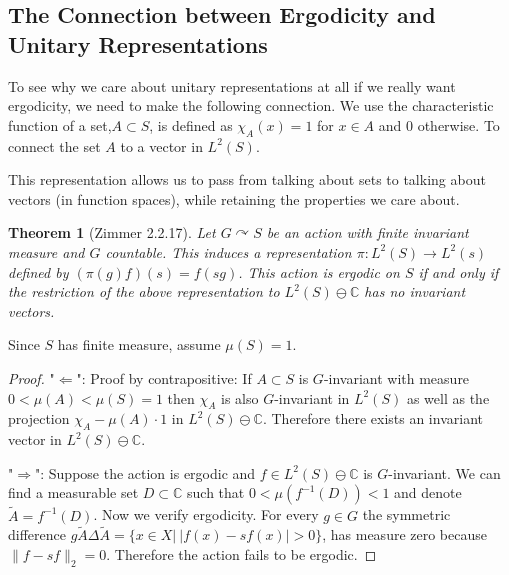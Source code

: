 \documentclass[
  12pt
]{article}
\numberwithin{equation}{section}
\newtheorem{thm}{Theorem}[section]
\theoremstyle{plain}
\newtheorem*{proof}{Proof}
\newcommand{\G}{\ensuremath{G}\xspace}
\begin{document}
  \hypertarget{the-connection-between-ergodicity-and-unitary-representations}{%
  \subsection{The Connection between Ergodicity and Unitary Representations}\label{the-connection-between-ergodicity-and-unitary-representations}}

  To see why we care about unitary representations at all if we really
  want ergodicity, we need to make the following connection. We use the
  characteristic function of a set,$A\subset S$, is defined as $\chi_A(x) = 1$
  for $x \in A$ and $0$ otherwise. To connect the set $A$ to a vector in
  $L^2(S)$.

  This representation allows us to pass from talking about sets to talking
  about vectors (in function spaces), while retaining the properties we care
  about.


  \begin{thm}[Zimmer 2.2.17]
    \label{thm:2.2.17}
    Let $G\curvearrowright S$ be an action  with \emph{ finite } invariant measure and \G countable.
    This induces a representation $\pi: L^2(S) \rightarrow L^2(s)$ defined by $(\pi(g)f)(s) = f(sg)$.
    This action is ergodic on $S$ if and only if the restriction of the above representation
    to $L^2(S) \ominus \mathbb{C}$ has no invariant vectors.
  \end{thm}

  Since $S$ has finite measure, assume $\mu(S) =1$.

  \begin{proof}

    "$\Leftarrow$": Proof by contrapositive:
    If $A\subset S$ is $G$-invariant
    with measure $0 < \mu(A) < \mu(S) = 1$ then $\chi_A$ is also $G$-invariant
    in $L^2(S)$ as well as the projection $\chi_A - \mu(A)\cdot 1$ in
    $L^2(S)\ominus \mathbb{C}$. Therefore there exists an invariant vector in
    $L^2(S)\ominus \mathbb{C}$.

    "$\Rightarrow$": \cite[Prop 2.7]{Kerr16}
    Suppose the action is ergodic and $f\in L^2(S)\ominus \mathbb{C}$ is
    $G$-invariant. We can find a measurable set $D\subset \mathbb{C}$ such that
    $0<\mu(f^{-1}(D)) < 1$ and denote $\widetilde{A} = f^{-1}(D)$. Now we verify
    ergodicity. For every $g\in G$ the symmetric difference
    $g\widetilde{A} \Delta \widetilde{A} = \{x \in X | \ |f(x)-sf(x)| > 0\}$,
    has measure zero because $\|f - sf\|_2=0$.
    Therefore the action fails to be ergodic.
  \end{proof}
\end{document}
